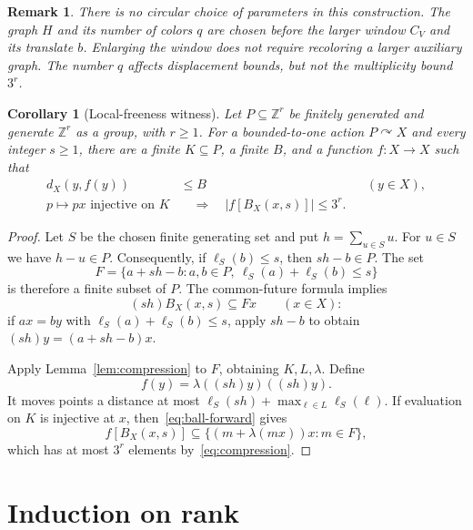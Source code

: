 \documentclass[10pt,a4paper]{amsart}
\newtheorem{corollary}[theorem]{Corollary}
\newtheorem{remark}[theorem]{Remark}
\newcommand{\ZZ}{\mathbb Z}
\newcommand{\act}{\curvearrowright}
\begin{document}
\begin{remark}\label{rem:parameters}
There is no circular choice of parameters in this construction. The graph
$H$ and its number of colors $q$ are chosen before the larger window $C_V$
and its translate $b$. Enlarging the window does not require recoloring a
larger auxiliary graph. The number $q$ affects displacement bounds, but
not the multiplicity bound $3^r$.
\end{remark}

\begin{corollary}[Local-freeness witness]\label{cor:local}
Let $P\subseteq\ZZ^r$ be finitely generated and generate $\ZZ^r$ as a
group, with $r\ge1$. For a bounded-to-one action $P\act X$ and every
integer $s\ge1$, there are a finite $K\subseteq P$, a finite $B$, and a
function $f:X\to X$ such that
\begin{align}
 d_X(y,f(y))&\le B &&(y\in X),\label{eq:displacement}\\
 p\mapsto px\text{ injective on }K
 &\quad\Longrightarrow\quad |f[B_X(x,s)]|\le3^r.
 \label{eq:local-multiplicity}
\end{align}
\end{corollary}

\begin{proof}
Let $S$ be the chosen finite generating set and put $h=\sum_{u\in S}u$.
For $u\in S$ we have $h-u\in P$. Consequently, if $\ell_S(b)\le s$, then
$sh-b\in P$. The set
\[
 F=\{a+sh-b:a,b\in P,\ \ell_S(a)+\ell_S(b)\le s\}
\]
is therefore a finite subset of $P$. The common-future formula implies
\begin{equation}\label{eq:ball-forward}
 (sh)B_X(x,s)\subseteq Fx\qquad(x\in X):
\end{equation}
if $ax=by$ with $\ell_S(a)+\ell_S(b)\le s$, apply $sh-b$ to obtain
$(sh)y=(a+sh-b)x$.

Apply Lemma~\ref{lem:compression} to $F$, obtaining $K,L,\lambda$. Define
\[
 f(y)=\lambda((sh)y)((sh)y).
\]
It moves points a distance at most
$\ell_S(sh)+\max_{\ell\in L}\ell_S(\ell)$. If evaluation on $K$ is
injective at $x$, then~\eqref{eq:ball-forward} gives
\[
 f[B_X(x,s)]
 \subseteq\{(m+\lambda(mx))x:m\in F\},
\]
which has at most $3^r$ elements by~\eqref{eq:compression}.
\end{proof}

\section{Induction on rank}\label{sec:induction}
\end{document}
